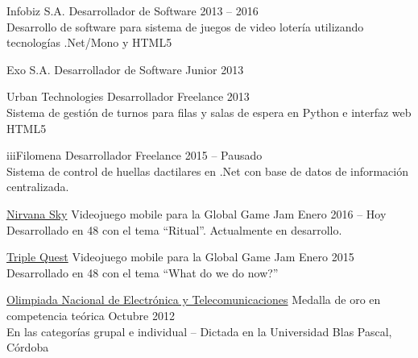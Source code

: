 \documentclass[10pt,a4paper]{article}
\begin{document}
\spacedhrule{0.8em}{-0.4em}


\vspace{0.2em}
\headedsection
    {Infobiz S.A.}
    {\textsc{}}{
    \headedsubsection
        {Desarrollador de Software}
        {2013 -- 2016}
        {\\Desarrollo de software para sistema de juegos de video lotería utilizando tecnologías .Net/Mono y HTML5}
}

\vspace{0.2em}
\headedsection
    {Exo S.A.}
    {\textsc{}}{
    \headedsubsection
        {Desarrollador de Software Junior}
        {2013}
        {}
}

\vspace{0.2em}
\headedsection
    {Urban Technologies}
    {\textsc{}}{
    \headedsubsection
        {Desarrollador Freelance}
        {2013}
        {\\Sistema de gestión de turnos para filas y salas de espera en Python e interfaz web HTML5}
}

\vspace{0.2em}
\headedsection
    {iiiFilomena}
    {\textsc{}}{
    \headedsubsection
        {Desarrollador Freelance}
        {2015 -- Pausado}
        {\\Sistema de control de huellas dactilares en .Net con base de datos de información centralizada.}
}

\pagebreak

\spacedhrule{0.8em}{-0.4em}


\vspace{0.2em}
\headedsection
    {\href{http://globalgamejam.org/2016/games/nirvana-sky}{Nirvana Sky}}
    {\textsc{}}{
    \headedsubsection
        {Videojuego mobile para la Global Game Jam}
        {Enero 2016 -- Hoy}
        {\\Desarrollado en 48 con el tema ``Ritual''. Actualmente en desarrollo.}
}

\vspace{0.2em}
\headedsection
    {\href{http://globalgamejam.org/2015/games/triple-quest}{Triple Quest}}
    {\textsc{}}{
    \headedsubsection
        {Videojuego mobile para la Global Game Jam}
        {Enero 2015}
        {\\Desarrollado en 48 con el tema ``What do we do now?''}
}

\vspace{0.2em}
\headedsection
    {\href{}{Olimpiada Nacional de Electrónica y Telecomunicaciones}}
    {\textsc{}}{
    \headedsubsection
        {Medalla de oro en competencia teórica}
        {Octubre 2012}
        {\\En las categorías grupal e individual -- Dictada en la Universidad Blas Pascal, Córdoba}
}
\end{document}
